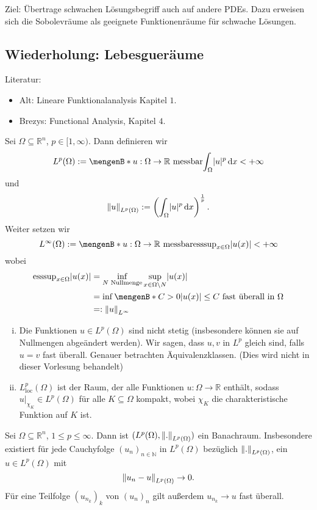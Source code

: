 Ziel: Übertrage schwachen Lösungsbegriff auch auf andere PDEs. Dazu erweisen sich die Sobolevräume als geeignete Funktionenräume für schwache Lösungen.
\subsection{Wiederholung: Lebesgueräume} 
\label{sub:wiederholung_lebesgueraume}
Literatur:
\begin{itemize}
	\item Alt: Lineare Funktionalanalysis Kapitel $1$.
	\item Brezys: Functional Analysis, Kapitel $4$.
\end{itemize}

\begin{definition*}[$L^p$-Räume]
	Sei $\Omega \subseteq  \mathbb{R}^n$, $p \in [1,\infty)$. Dann definieren wir 
	\[
		L^p(\Omega) := \set[u: \Omega \to \mathbb{R} \text{ messbar}]{ \int_{\Omega}^{} \abs{u}^p \,\mathrm{d}x < + \infty}
	\]
	und 
	\[
		\norm{u}_{L^p(\Omega)} := \left( \int_{\Omega}^{}\abs{u}^p \,\mathrm{d}x \right)^{\frac{1}{p}}.
	\]
	Weiter setzen wir
	\[
		L^{\infty}(\Omega) := \set[u: \Omega \to \mathbb{R} \text{ messbar}]{\esssup_{x \in \Omega}\abs{u(x)} < + \infty}
	\]
	wobei
	\begin{align*}
		\esssup_{x \in \Omega} \abs{u(x)} &= \inf_{N \text{ Nullmenge}} \sup_{x \in \Omega \setminus N} \abs{u(x)} \\
		&= \inf \set[C >0]{\abs{u(x)}\leq C \text{ fast überall in }\Omega} \\
		&=: \norm{u}_{L^{\infty}}
	\end{align*}
\end{definition*}
\begin{bemerkung}
	\begin{enumerate}[(i)]
		\item Die Funktionen $u \in L^p(\Omega)$ sind nicht stetig (insbesondere können sie auf Nullmengen abgeändert werden). Wir sagen, dass $u,v$ in $L^p$
		gleich sind, falls $u=v$ fast überall. Genauer betrachten Äquivalenzklassen. (Dies wird nicht in dieser Vorlesung behandelt)
		\item $L^p_{\text{loc}}(\Omega)$ ist der Raum, der alle Funktionen $u: \Omega \to  \mathbb{R}$ enthält, sodass $u  \Big|_{\chi_K}^{} \in L^p(\Omega)$ 
		für alle $K \subseteq \Omega$ kompakt, wobei $\chi_K$ die charakteristische Funktion auf $K$ ist.
	\end{enumerate}
\end{bemerkung}
\begin{satz}[Vollständigkeit]
	Sei $\Omega \subseteq  \mathbb{R}^n$, $1 \leq p \leq \infty$. Dann ist $(L^p(\Omega),\norm{.}_{L^p(\Omega)})$ ein Banachraum. Insbesondere existiert für jede Cauchyfolge $(u_n)_{n \in \mathbb{N}}$ in $L^p(\Omega)$ bezüglich $\norm{.}_{L^p(\Omega)}$, ein $u \in L^p(\Omega)$ mit 
	\[
		\norm{u_n - u}_{L^p(\Omega)} \to 0.
	\]
	Für eine Teilfolge $(u_{n_k})_k$ von $(u_n)_n$ gilt außerdem $u_{n_k} \to u$ fast überall.
\end{satz}

